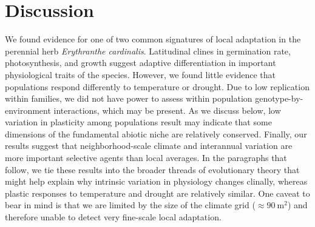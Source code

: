 \documentclass[11pt, oneside]{article}
\begin{document}

\section*{Discussion}

We found evidence for one of two common signatures of local adaptation in the perennial herb \textit{Erythranthe cardinalis}. Latitudinal clines in germination rate, photosynthesis, and growth suggest adaptive differentiation in important physiological traits of the species. However, we found little evidence that populations respond differently to temperature or drought. Due to low replication within families, we did not have power to assess within population genotype-by-environment interactions, which may be present. As we discuss below, low variation in plasticity among populations result may indicate that some dimensions of the fundamental abiotic niche are relatively conserved. Finally, our results suggest that neighborhood-scale climate and interannual variation are more important selective agents than local averages. In the paragraphs that follow, we tie these results into the broader threads of evolutionary theory that might help explain why intrinsic variation in physiology changes clinally, whereas plastic responses to temperature and drought are relatively similar. One caveat to bear in mind is that we are limited by the size of the climate grid ($\approx 90~\text{m}^2$) and therefore unable to detect very fine-scale local adaptation.
\end{document}
